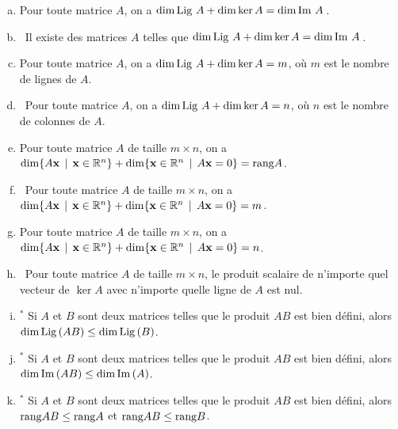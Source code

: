 \begin{prob}
\begin{enumerate}[a)]
\medskip
\item Pour toute matrice $A$, on a $\dim \operatorname{Lig\,} A + \dim \ker A= \dim \operatorname{Im}\, A$\,.
\medskip
 

\item\sov~Il existe des matrices $A$ telles que $\dim \operatorname{Lig\,} A+ \dim \ker A= \dim \operatorname{Im}\, A$\,.
\medskip
 
\item Pour toute matrice $A$, on a $\dim \operatorname{Lig\,} A+ \dim \ker A= m$, o\`u $m$ est le nombre de lignes de $A$.
\medskip
 
\item\sov~Pour toute matrice $A$, on a $\dim \operatorname{Lig\,} A+ \dim \ker A= n$, o\`u $n$ est le nombre de colonnes de $A$.
\medskip
 
\item Pour toute matrice $A$ de taille $m\times n$, on a $\dim \{A\mathbf{x}\, \mid \, \mathbf{x}\in \mathbb{R}^n\} + \dim\{\mathbf{x} \in \mathbb{R}^n \, \mid \, A\mathbf{x}=0\}= \textrm{rang} A$.
\medskip
 
\item\sov~Pour toute matrice $A$ de taille $m\times n$, on a  $\dim \{A\mathbf{x}\, \mid \, \mathbf{x}\in \mathbb{R}^n\} + \dim\{\mathbf{x} \in \mathbb{R}^n \, \mid \, A\mathbf{x}=0\}= m$.
\medskip
 

\item Pour toute matrice $A$ de taille $m\times n$, on a  $\dim \{A\mathbf{x}\, \mid \, \mathbf{x}\in \mathbb{R}^n\} + \dim\{\mathbf{x} \in \mathbb{R}^n \, \mid \, A\mathbf{x}=0\}= n$.
\medskip
 
\item\sov~Pour toute matrice $A$ de taille $m\times n$, le produit scalaire de n'importe quel vecteur de $\ker A$ avec n'importe quelle ligne de $A$ est nul.
\medskip
 
\item$^\ast$ Si $A$ et $B$ sont deux matrices telles que le produit $AB$ est bien défini, alors $\dim \operatorname{Lig\,}(AB) \le \dim \operatorname{Lig\,}(B)$. 
\medskip
 
\item$^\ast$ Si $A$ et $B$ sont deux matrices telles que le produit $AB$ est bien défini, alors $\dim \operatorname{Im}\,(AB) \le \dim \operatorname{Im}\,(A)$.
\medskip
 
\item$^\ast$ Si $A$ et $B$ sont deux matrices telles que le produit $AB$ est bien défini, alors $\textrm{rang} AB \le \textrm{rang} A$ et $\textrm{rang} AB \le \textrm{rang} B$.
 
\end{enumerate}
\end{prob}

